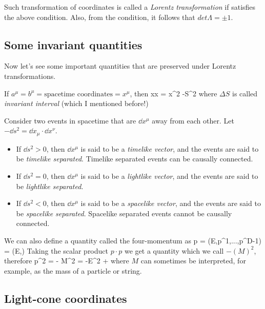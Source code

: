 \documentclass[oneside, 12pt]{book}
\begin{document}
Such transformation of coordinates is called a \textit{Lorentz transformation} if satisfies the above condition. Also, from the condition, it follows that \( det\Lambda = \pm 1\).\par

\subsection{Some invariant quantities}

Now let's see some important quantities that are preserved under Lorentz transformations.\par

If \(a^{\mu}=b^{\mu}=\text{spacetime coordinates}=x^{\mu}\), then
\beq[] x\cdot x = x^2 \doteq -\Delta S^2 \eeq
where \(\Delta S\) is called \textit{invariant interval} (which I mentioned before!)

Consider two events in spacetime that are \(\dd{x}^{\mu}\) away from each other. Let \(- \dd{s}^2 = \dd{x}_{\mu}\cdot \dd{x}^{\nu} \).
\begin{itemize}
    \item If \( \dd{s}^2 > 0\), then \( \dd{x}^{\mu}\) is said to be a \textit{timelike vector}, and the events are said to be \textit{timelike separated}. Timelike separated events can be causally connected.
    \item If \( \dd{s}^2 = 0\), then \( \dd{x}^{\mu}\) is said to be a \textit{lightlike vector}, and the events are said to be \textit{lightlike separated}.
    \item If \( \dd{s}^2 < 0\), then \( \dd{x}^{\mu}\) is said to be a \textit{spacelike vector}, and the events are said to be \textit{spacelike separated}. Spacelike separated events cannot be causally connected.
\end{itemize}

We can also define a quantity called the four-momentum as
\beq p = \left(E,p^1,...,p^{D-1}\right) = \left(E,\right)\eeq
Taking the scalar product \(p\cdot p\) we get a quantity which we call \(-(M)^2 \), therefore
\beq[eq:p2m20constrain] p^2 = - M^2 = -E^2 + \cdot{}\eeq
where \(M\) can sometimes be interpreted, for example, as the mass of a particle or string.\par

\subsection{Light-cone coordinates}
\end{document}
